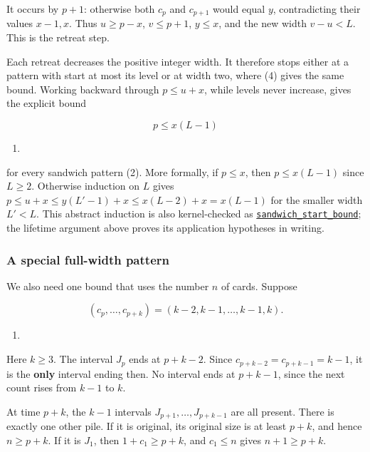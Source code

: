 \documentclass[11pt,a4paper]{article}
\providecommand{\tightlist}{\setlength{\itemsep}{0pt}\setlength{\parskip}{0pt}}
\begin{document}
It occurs by \(p+1\): otherwise both \(c_p\) and \(c_{p+1}\) would equal \(y\), contradicting their values \(x-1,x\). Thus \(u\ge p-x\), \(v\le p+1\), \(y\le x\), and the new width \(v-u<L\). This is the retreat step.

Each retreat decreases the positive integer width. It therefore stops either at a pattern with start at most its level or at width two, where (4) gives the same bound. Working backward through \(p\le u+x\), while levels never increase, gives the explicit bound

\[
\boxed{p\le x(L-1)}
\]

\begin{enumerate}
\def\labelenumi{(\arabic{enumi})}
\setcounter{enumi}{5}
\tightlist
\item
\end{enumerate}

for every sandwich pattern (2). More formally, if \(p\le x\), then \(p\le x(L-1)\) since \(L\ge2\). Otherwise induction on \(L\) gives \(p\le u+x\le y(L'-1)+x\le x(L-2)+x=x(L-1)\) for the smaller width \(L'<L\). This abstract induction is also kernel-checked as \href{https://github.com/mpelteshki/climbing-to-the-frontier/blob/212bba53b1818c08c40b8c4b48f636651eaf6410/cagent/p3/lean/ProofPursuit/P3/C2SandwichBound.lean}{\texttt{sandwich\_start\_bound}}; the lifetime argument above proves its application hypotheses in writing.

\subsubsection{A special full-width pattern}\label{a-special-full-width-pattern}

We also need one bound that uses the number \(n\) of cards. Suppose

\[
(c_p,\ldots,c_{p+k})=(k-2,k-1,\ldots,k-1,k).
\]

\begin{enumerate}
\def\labelenumi{(\arabic{enumi})}
\setcounter{enumi}{6}
\tightlist
\item
\end{enumerate}

Here \(k\ge3\). The interval \(J_p\) ends at \(p+k-2\). Since \(c_{p+k-2}=c_{p+k-1}=k-1\), it is the \textbf{only} interval ending then. No interval ends at \(p+k-1\), since the next count rises from \(k-1\) to \(k\).

At time \(p+k\), the \(k-1\) intervals \(J_{p+1},\ldots,J_{p+k-1}\) are all present. There is exactly one other pile. If it is original, its original size is at least \(p+k\), and hence \(n\ge p+k\). If it is \(J_1\), then \(1+c_1\ge p+k\), and \(c_1\le n\) gives \(n+1\ge p+k\).
\end{document}

